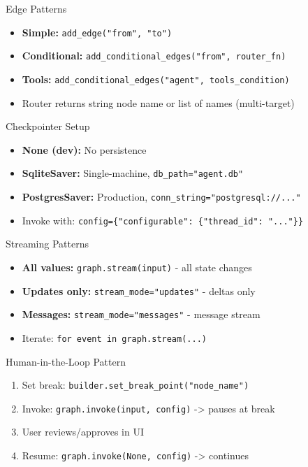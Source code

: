 \documentclass[aspectratio=169,11pt]{beamer}
\begin{document}
\begin{frame}{Edge Patterns}
\setlength{\itemsep}{1pt}
\begin{itemize}
\item \textbf{Simple:} \texttt{add\_edge("from", "to")}
\item \textbf{Conditional:} \texttt{add\_conditional\_edges("from", router\_fn)}
\item \textbf{Tools:} \texttt{add\_conditional\_edges("agent", tools\_condition)}
\item Router returns string node name or list of names (multi-target)
\end{itemize}
\end{frame}

\begin{frame}{Checkpointer Setup}
\setlength{\itemsep}{1pt}
\begin{itemize}
\item \textbf{None (dev):} No persistence
\item \textbf{SqliteSaver:} Single-machine, \texttt{db\_path="agent.db"}
\item \textbf{PostgresSaver:} Production, \texttt{conn\_string="postgresql://..."}
\item Invoke with: \texttt{config=\{"configurable": \{"thread\_id": "..."\}\}}
\end{itemize}
\end{frame}

\begin{frame}{Streaming Patterns}
\setlength{\itemsep}{1pt}
\begin{itemize}
\item \textbf{All values:} \texttt{graph.stream(input)} - all state changes
\item \textbf{Updates only:} \texttt{stream\_mode="updates"} - deltas only
\item \textbf{Messages:} \texttt{stream\_mode="messages"} - message stream
\item Iterate: \texttt{for event in graph.stream(...)}
\end{itemize}
\end{frame}

\begin{frame}{Human-in-the-Loop Pattern}
\setlength{\itemsep}{1pt}
\begin{enumerate}
\item Set break: \texttt{builder.set\_break\_point("node\_name")}
\item Invoke: \texttt{graph.invoke(input, config)} -> pauses at break
\item User reviews/approves in UI
\item Resume: \texttt{graph.invoke(None, config)} -> continues
\end{enumerate}
\end{frame}
\end{document}
